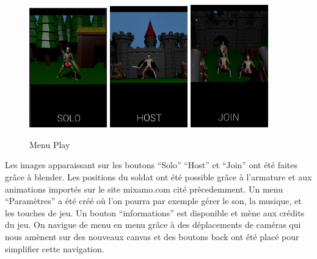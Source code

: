 \documentclass[12pt]{report}
\begin{document}
\begin{figure}[H]
    \centering
    \includegraphics[width=0.3\textwidth]{SoloIcon}
    \includegraphics[width=0.3\textwidth]{HostIcon}
    \includegraphics[width=0.3\textwidth]{JoinIcon}
    \caption{Menu Play}
\end{figure}

Les images apparaissant sur les boutons “Solo” “Host” et “Join” ont été faites
grâce à blender. Les positions du soldat ont été possible grâce à l’armature et
aux animations importés sur le site mixamo.com cité prècedemment. Un menu
“Paramètres” a été créé où l’on pourra par exemple gérer le son, la musique, et
les touches de jeu. Un bouton “informations” est disponible et mène aux crédits
du jeu. On navigue de menu en menu grâce à des déplacements de caméras qui
nous amènent sur des nouveaux canvas et des boutons back ont été placé pour
simplifier cette navigation.
\end{document}
